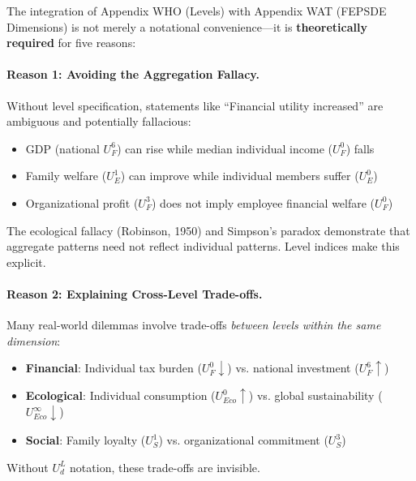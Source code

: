\begin{tcolorbox}[colback=gray!5!white, colframe=gray!75!black, 
    title=Why AAA $\times$ C Is Theoretically Necessary]

The integration of Appendix WHO (Levels) with Appendix WAT (FEPSDE Dimensions) is not 
merely a notational convenience---it is \textbf{theoretically required} for five reasons:

\paragraph{Reason 1: Avoiding the Aggregation Fallacy.}

Without level specification, statements like ``Financial utility increased'' are 
ambiguous and potentially fallacious:
\begin{itemize}[nosep]
\item GDP (national $U^6_F$) can rise while median individual income ($U^0_F$) falls
\item Family welfare ($U^1_E$) can improve while individual members suffer ($U^0_E$)
\item Organizational profit ($U^3_F$) does not imply employee financial welfare ($U^0_F$)
\end{itemize}

The ecological fallacy (Robinson, 1950) and Simpson's paradox demonstrate that 
aggregate patterns need not reflect individual patterns. Level indices make this explicit.

\paragraph{Reason 2: Explaining Cross-Level Trade-offs.}

Many real-world dilemmas involve trade-offs \textit{between levels within the same dimension}:
\begin{itemize}[nosep]
\item \textbf{Financial}: Individual tax burden ($U^0_F \downarrow$) vs. national investment ($U^6_F \uparrow$)
\item \textbf{Ecological}: Individual consumption ($U^0_{Eco} \uparrow$) vs. global sustainability ($U^{\infty}_{Eco} \downarrow$)
\item \textbf{Social}: Family loyalty ($U^1_S$) vs. organizational commitment ($U^3_S$)
\end{itemize}

Without $U^L_d$ notation, these trade-offs are invisible.


\end{tcolorbox}
